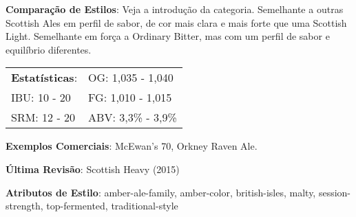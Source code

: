 \textbf{Comparação de Estilos}: Veja a introdução da categoria. Semelhante a outras Scottish Ales em perfil de sabor, de cor mais clara e mais forte que uma Scottish Light. Semelhante em força a Ordinary Bitter, mas com um perfil de sabor e equilíbrio diferentes.

\begin{tabular}{@{}p{35mm}p{35mm}@{}}
  \textbf{Estatísticas}: & OG: 1,035 - 1,040 \\
  IBU: 10 - 20 & FG: 1,010 - 1,015  \\
  SRM: 12 - 20  & ABV: 3,3\% - 3,9\%
\end{tabular}

\textbf{Exemplos Comerciais}: McEwan's 70, Orkney Raven Ale.

\textbf{Última Revisão}: Scottish Heavy (2015)

\textbf{Atributos de Estilo}: amber-ale-family, amber-color, british-isles, malty, session-strength, top-fermented, traditional-style
